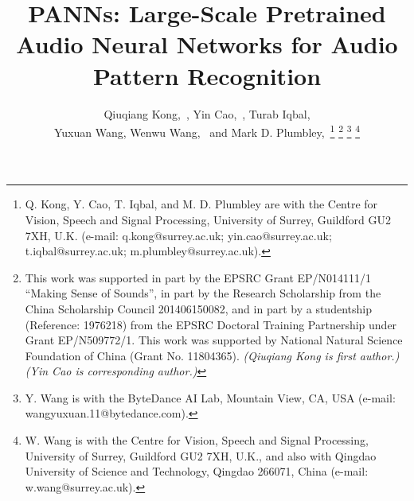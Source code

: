 \documentclass[journal]{IEEEtran}
\begin{document}
\title{{\huge PANNs: Large-Scale Pretrained Audio Neural Networks for Audio Pattern Recognition}}





\author{Qiuqiang Kong,~, Yin Cao,~, Turab Iqbal, \\Yuxuan Wang, Wenwu Wang,~ and Mark D. Plumbley,~\thanks{Q. Kong, Y. Cao, T. Iqbal, and M. D. Plumbley are with the Centre for Vision, Speech and Signal Processing, University of Surrey, Guildford GU2 7XH, U.K. (e-mail: q.kong@surrey.ac.uk; yin.cao@surrey.ac.uk;  t.iqbal@surrey.ac.uk; m.plumbley@surrey.ac.uk).}
\thanks{This work was supported in part by the EPSRC Grant EP/N014111/1 ``Making Sense of Sounds'', in part by the Research Scholarship from the China Scholarship Council 201406150082, and in part by a studentship (Reference: 1976218) from the EPSRC Doctoral Training Partnership under Grant EP/N509772/1. This work was supported by National Natural Science Foundation of China (Grant No. 11804365). \textit{(Qiuqiang Kong is first author.) (Yin Cao is corresponding author.)}}
\thanks{Y. Wang is with the ByteDance AI Lab, Mountain View, CA, USA (e-mail:
wangyuxuan.11@bytedance.com).}
\thanks{W. Wang is with the Centre for Vision, Speech and Signal Processing,
University of Surrey, Guildford GU2 7XH, U.K., and also with Qingdao
University of Science and Technology, Qingdao 266071, China (e-mail:
w.wang@surrey.ac.uk).}}



















\maketitle
\end{document}

